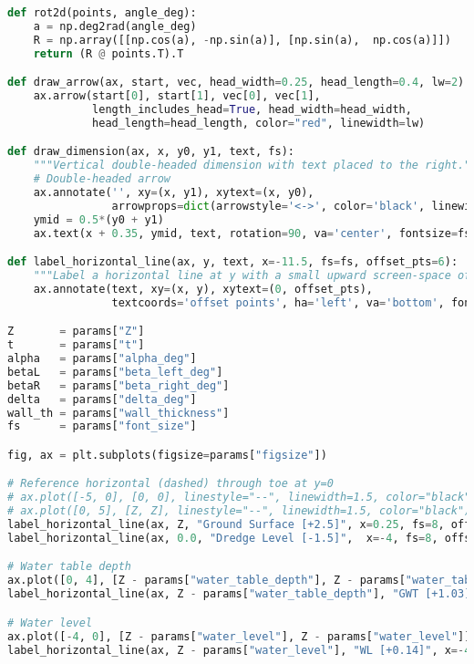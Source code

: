 \begin{lstlisting}[language=Python]
def rot2d(points, angle_deg):
    a = np.deg2rad(angle_deg)
    R = np.array([[np.cos(a), -np.sin(a)], [np.sin(a),  np.cos(a)]])
    return (R @ points.T).T

def draw_arrow(ax, start, vec, head_width=0.25, head_length=0.4, lw=2):
    ax.arrow(start[0], start[1], vec[0], vec[1],
             length_includes_head=True, head_width=head_width,
             head_length=head_length, color="red", linewidth=lw)

def draw_dimension(ax, x, y0, y1, text, fs):
    """Vertical double-headed dimension with text placed to the right."""
    # Double-headed arrow
    ax.annotate('', xy=(x, y1), xytext=(x, y0),
                arrowprops=dict(arrowstyle='<->', color='black', linewidth=1.8))
    ymid = 0.5*(y0 + y1)
    ax.text(x + 0.35, ymid, text, rotation=90, va='center', fontsize=fs, color='black')

def label_horizontal_line(ax, y, text, x=-11.5, fs=fs, offset_pts=6):
    """Label a horizontal line at y with a small upward screen-space offset."""
    ax.annotate(text, xy=(x, y), xytext=(0, offset_pts),
                textcoords='offset points', ha='left', va='bottom', fontsize=fs, color='black')

Z       = params["Z"]
t       = params["t"]
alpha   = params["alpha_deg"]
betaL   = params["beta_left_deg"]
betaR   = params["beta_right_deg"]
delta   = params["delta_deg"]
wall_th = params["wall_thickness"]
fs      = params["font_size"]

fig, ax = plt.subplots(figsize=params["figsize"])

# Reference horizontal (dashed) through toe at y=0
# ax.plot([-5, 0], [0, 0], linestyle="--", linewidth=1.5, color="black")
# ax.plot([0, 5], [Z, Z], linestyle="--", linewidth=1.5, color="black")
label_horizontal_line(ax, Z, "Ground Surface [+2.5]", x=0.25, fs=8, offset_pts=6)
label_horizontal_line(ax, 0.0, "Dredge Level [-1.5]",  x=-4, fs=8, offset_pts=6)

# Water table depth
ax.plot([0, 4], [Z - params["water_table_depth"], Z - params["water_table_depth"]], linestyle="--", linewidth=1.5, color="black")
label_horizontal_line(ax, Z - params["water_table_depth"], "GWT [+1.03]", x=0.25, fs=8, offset_pts=6)

# Water level
ax.plot([-4, 0], [Z - params["water_level"], Z - params["water_level"]], linestyle="--", linewidth=1.5, color="black")
label_horizontal_line(ax, Z - params["water_level"], "WL [+0.14]", x=-4, fs=8, offset_pts=6)


\end{lstlisting}
